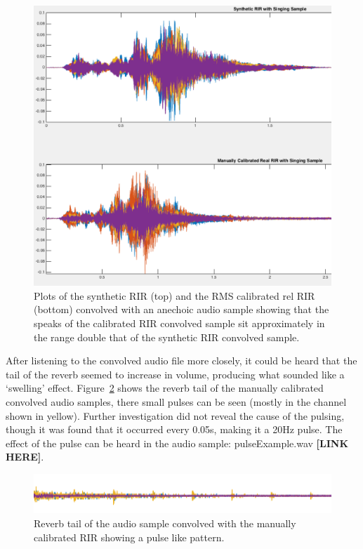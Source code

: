 \documentclass[../../main.tex]{subfiles}
\begin{document}
		\begin{figure}[H]
			\begin{center}
				\includegraphics[scale = 0.3]{Sections/Implementation/RealRIRs/images/calibration/CalMan_Sing_edit.png} 
				\caption{Plots of the synthetic \ac{RIR} (top) and the RMS calibrated rel \ac{RIR} (bottom) convolved with an anechoic audio sample showing that the speaks of the calibrated \ac{RIR} convolved sample sit approximately in the range double that of the synthetic \ac{RIR} convolved sample.}
				\label{calMansing}
			\end{center}
		\end{figure}

		After listening to the convolved audio file more closely, it could be heard that the tail of the reverb seemed to increase in volume, producing what sounded like a `swelling' effect. Figure~\ref{pulse} shows the reverb tail of the manually calibrated convolved audio samples, there small pulses can be seen (mostly in the channel shown in yellow). Further investigation did not reveal the cause of the pulsing, though it was found that it occurred every 0.05s, making it a 20Hz pulse. The effect of the pulse can be heard in the audio sample: pulseExample.wav \textbf{[LINK HERE]}.

		\begin{figure}[H]
			\begin{center}
				\includegraphics[scale = 1]{Sections/Implementation/RealRIRs/images/calibration/cal_pulse.png} 
				\caption{Reverb tail of the audio sample convolved with the manually calibrated \ac{RIR} showing a pulse like pattern.}
				\label{pulse}
			\end{center}
		\end{figure}
\end{document}
